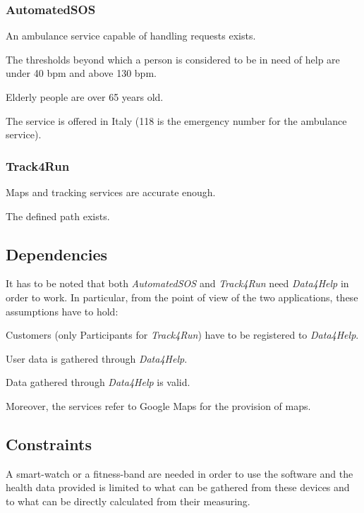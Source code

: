         \subsubsection{AutomatedSOS}
            \begin{enumerate}[label={[}D2.\arabic*{]}]
                \item An ambulance service capable of handling requests exists.
                
                \item The thresholds beyond which a person is considered to be in need of help are under 40 bpm and above 130 bpm.
                \item Elderly people are over 65 years old.
                
                \item The service is offered in Italy (118 is the emergency number for the ambulance service).
            \end{enumerate}
            
            \subsubsection{Track4Run}
                \begin{enumerate}[label={[}D3.\arabic*{]}]
                    \item Maps and tracking services are accurate enough.
                    
                    \item The defined path exists.
                \end{enumerate}
                
    \subsection{Dependencies}
        It has to be noted that both \emph{AutomatedSOS} and \emph{Track4Run} need \emph{Data4Help} in order to work. In particular, from the point of view of the two applications, these assumptions have to hold:
        \begin{enumerate}[label={[}D2-3.\arabic*{]}, leftmargin=*]
            \item Customers (only Participants for \emph{Track4Run}) have to be registered to \emph{Data4Help}.
            
            \item User data is gathered through \emph{Data4Help}.
            
            \item Data gathered through \emph{Data4Help} is valid.
        \end{enumerate}
        
        Moreover, the services refer to Google Maps for the provision of maps.
        
    \subsection{Constraints}
        A smart-watch or a fitness-band are needed in order to use the software and the health data provided is limited to what can be gathered from these devices and to what can be directly calculated from their measuring.

